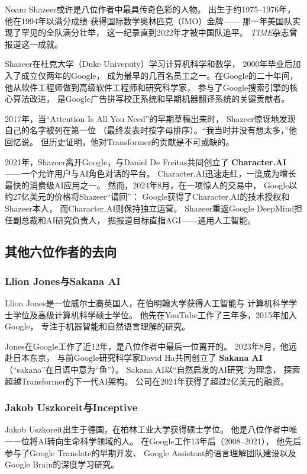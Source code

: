 Noam Shazeer或许是八位作者中最具传奇色彩的人物。
出生于约1975--1976年，他在1994年以满分成绩
获得国际数学奥林匹克（IMO）金牌——
那一年美国队实现了罕见的全队满分壮举，
这一纪录直到2022年才被中国队追平。
\textit{TIME}杂志曾报道这一成就。

Shazeer在杜克大学（Duke University）学习计算机科学和数学，
2000年毕业后加入了成立仅两年的Google，
成为最早的几百名员工之一。在Google的二十年间，
他从软件工程师做到高级软件工程师和研究科学家，
参与了Google搜索引擎的核心算法改进，
是Google广告拼写校正系统和早期机器翻译系统的关键贡献者。

2017年，当``Attention Is All You Need''的早期草稿出来时，
Shazeer惊讶地发现自己的名字被列在第一位
（最终发表时按字母排序）。``我当时并没有想太多，''他回忆说。
但历史证明，他对Transformer的贡献是不可或缺的。

2021年，Shazeer离开Google，与Daniel De Freitas共同创立了
\textbf{Character.AI}——一个允许用户与AI角色对话的平台。
Character.AI迅速走红，一度成为增长最快的消费级AI应用之一。
然而，2024年8月，在一项惊人的交易中，
Google以约27亿美元的价格将Shazeer``请回''：
Google获得了Character.AI的技术授权和Shazeer本人，
而Character.AI则保持独立运营。
Shazeer重返Google DeepMind担任副总裁和AI研究负责人，
据报道目标直指AGI——通用人工智能。

\bigskip

\subsection{其他六位作者的去向}
\label{sec:other-transformer-authors}

\subsubsection{Llion Jones与Sakana AI}
Llion Jones是一位威尔士裔英国人，在伯明翰大学获得人工智能与
计算机科学学士学位及高级计算机科学硕士学位。
他先在YouTube工作了三年多，2015年加入Google，
专注于机器智能和自然语言理解的研究。

Jones在Google工作了近12年，是八位作者中最后一位离开的。
2023年8月，他远赴日本东京，
与前Google研究科学家David Ha共同创立了
\textbf{Sakana AI}（``sakana''在日语中意为``鱼''）。
Sakana AI以``自然启发的AI研究''为理念，
探索超越Transformer的下一代AI架构。
公司在2024年获得了超过2亿美元的融资。

\subsubsection{Jakob Uszkoreit与Inceptive}
Jakob Uszkoreit出生于德国，在柏林工业大学获得硕士学位。
他是八位作者中唯一一位将AI转向生命科学领域的人。
在Google工作13年后（2008--2021），
他先后参与了Google Translate的早期开发、
Google Assistant的语言理解团队建设以及Google Brain的深度学习研究。

